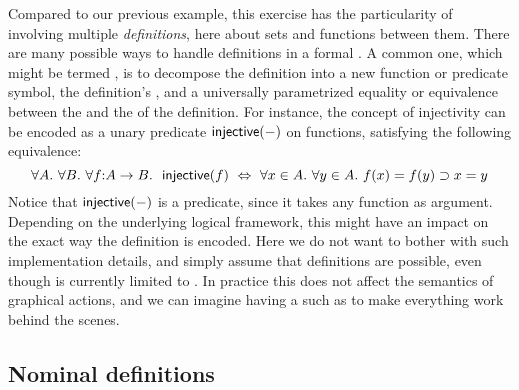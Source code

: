 \AP
Compared to our previous example, this exercise has the particularity of
involving multiple \emph{definitions}, here about sets and functions between
them. There are many possible ways to handle definitions in a formal . A common one, which might be termed , is to decompose
the definition into a new function or predicate symbol, the definition's
, and a universally parametrized equality or equivalence between the
 and the  of the definition. For instance, the concept of
injectivity can be encoded as a unary predicate $\mbox{\textsf{injective}}(-)$ on
functions, satisfying the following equivalence:
$$\forall A.\ \forall B.\ \forall f{:}A \to B.~\ \mbox{\textsf{injective}}(f) ~\Leftrightarrow~ \forall x
\in A.\ \forall y \in A.\ f(x) = f(y) \supset x = y$$
Notice that $\mbox{\textsf{injective}}(-)$ is a \emph{} predicate, since it
takes any function as argument. Depending on the underlying logical framework,
this might have an impact on the exact way the definition is encoded. Here we do
not want to bother with such implementation details, and simply assume that
 definitions are possible, even though  is currently limited
to . In practice this does not affect the semantics of
graphical actions, and we can imagine having a   such as
 to make everything work behind the scenes.

\subsection{Nominal definitions}


